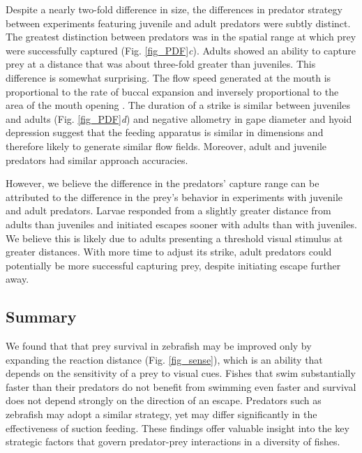\documentclass[]{rsos}%
\begin{document}
Despite a nearly two-fold difference in size, the differences in predator strategy between experiments featuring juvenile and adult predators were subtly distinct.
The greatest distinction between predators was in the spatial range at which prey were successfully captured (Fig. \ref{fig_PDF}\textit{c}).
Adults showed an ability to capture prey at a distance that was about three-fold greater than juveniles.
This difference is somewhat surprising. 
The flow speed generated at the mouth is proportional to the rate of buccal expansion and inversely proportional to the area of the mouth opening \cite{Holzman:2008jc,Muller:1982p335}.
The duration of a strike is similar between juveniles and adults (Fig. \ref{fig_PDF}\textit{d}) and negative allometry in gape diameter and hyoid depression \cite{Hernandez:2000uma} suggest that the feeding apparatus is similar in dimensions and therefore likely to generate similar flow fields.
Moreover, adult and juvenile predators had similar approach accuracies.

However, we believe the difference in the predators' capture range can be attributed to the difference in the prey's behavior in experiments with juvenile and adult predators.
Larvae responded from a slightly greater distance from adults than juveniles and initiated escapes sooner with adults than with juveniles.
We believe this is likely due to adults presenting a threshold visual stimulus at greater distances.
With more time to adjust its strike, adult predators could potentially be more successful capturing prey, despite initiating escape further away. 


\subsection*{Summary} 

We found that that prey survival in zebrafish may be improved only by expanding the reaction distance (Fig. \ref{fig_sense}), which is an ability that depends on the sensitivity of a prey to visual cues. 
Fishes that swim substantially faster than their predators do not benefit from swimming even faster and survival does not depend strongly on the direction of an escape.
Predators such as zebrafish may adopt a similar strategy, yet may differ significantly in the effectiveness of suction feeding.
These findings offer valuable insight into the key strategic factors that govern predator-prey interactions in a diversity of fishes. 



\end{document}

